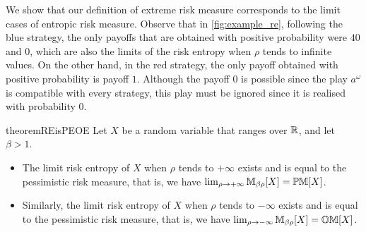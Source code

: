 We show that our definition of extreme risk measure corresponds to the limit cases of entropic risk measure.
Observe that in \cref{fig:example_re}, following the  blue strategy, the only payoffs that are obtained with positive probability were $40$ and $0$, which are also the limits of the risk entropy when $\rho$ tends to infinite values.
On the other hand, in the red strategy, the only payoff obtained with positive probability is payoff $1$. Although the payoff $0$ is possible since the play $a^\omega$ is compatible with every strategy, this play must be ignored since it is realised with probability $0$.

\begin{restatable}[App.~\ref{app:RE=PEorOE}]{theorem}{REisPEOE}\label{thm:RE=PEorOE}
    Let $X$ be a random variable that ranges over $\mathbb{R}$, and let $\beta > 1$.

    \begin{itemize}
        \item The limit risk entropy of $X$ when $\rho$ tends to $+\infty$ exists and is equal to the pessimistic risk measure, that is, we have $\lim_{\rho \to +\infty} \mathbb{M}_{\beta\rho} [X] = \mathbb{PM}[X]$.    
       \item Similarly, the limit risk entropy of $X$ when $\rho$ tends to $-\infty$ exists and is equal to the pessimistic risk measure, that is, we have $\lim_{\rho \to -\infty} \mathbb{M}_{\beta\rho} [X] = \mathbb{OM}[X]$.
    \end{itemize}
\end{restatable}
